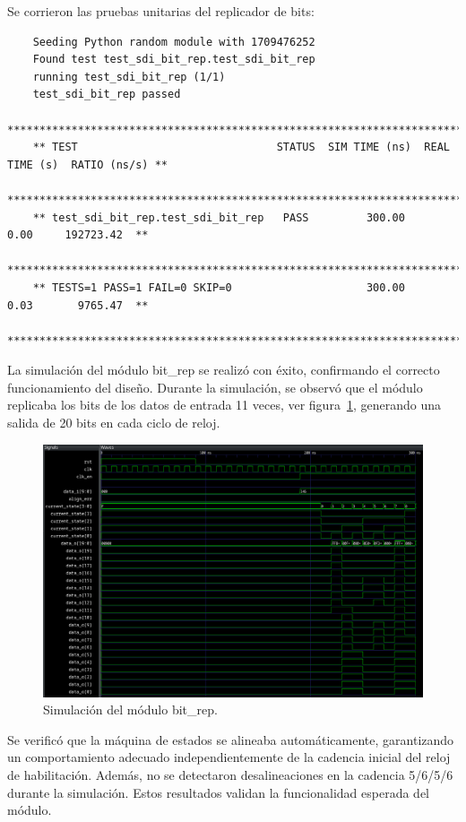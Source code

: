   Se corrieron las pruebas unitarias del replicador de bits:

  {\scriptsize\begin{verbatim}
    Seeding Python random module with 1709476252
    Found test test_sdi_bit_rep.test_sdi_bit_rep
    running test_sdi_bit_rep (1/1)
    test_sdi_bit_rep passed
    *******************************************************************************************
    ** TEST                               STATUS  SIM TIME (ns)  REAL TIME (s)  RATIO (ns/s) **
    *******************************************************************************************
    ** test_sdi_bit_rep.test_sdi_bit_rep   PASS         300.00           0.00     192723.42  **
    *******************************************************************************************
    ** TESTS=1 PASS=1 FAIL=0 SKIP=0                     300.00           0.03       9765.47  **
    *******************************************************************************************
  \end{verbatim}}

  La simulación del módulo bit\_rep se realizó con éxito, confirmando el correcto
  funcionamiento del diseño. Durante la simulación, se observó que el módulo
  replicaba los bits de los datos de entrada 11 veces, ver figura~\ref{fig:bit-rep},
  generando una salida de 20 bits en cada ciclo de reloj.

  \begin{figure}[h]
    \centering
    \includegraphics[width=1\textwidth]{./Figures/bit_rep.png}
    \caption{Simulación del módulo bit\_rep.}\label{fig:bit-rep}
  \end{figure}
  
  Se verificó que la máquina de estados se alineaba automáticamente, garantizando
  un comportamiento adecuado independientemente de la cadencia inicial del reloj
  de habilitación. Además, no se detectaron desalineaciones en la cadencia 5/6/5/6
  durante la simulación. Estos resultados validan la funcionalidad esperada del
  módulo.

